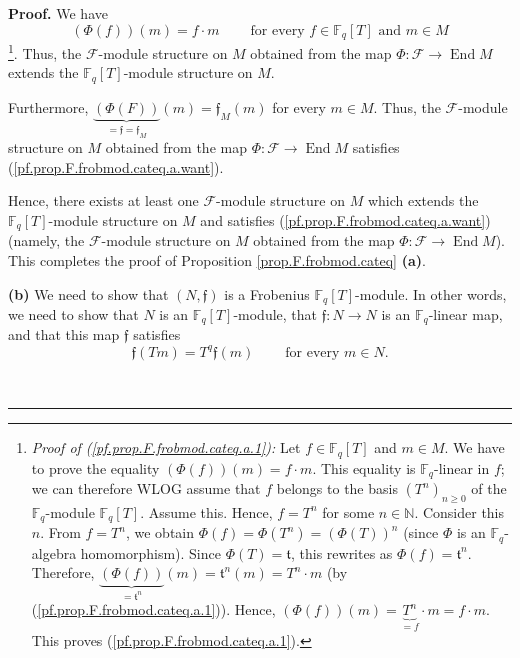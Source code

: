 \documentclass[numbers=enddot,12pt,final,onecolumn,notitlepage]{scrartcl}%
\theoremstyle{definition}
\newenvironment{proof}[1][Proof]{\noindent\textbf{#1.} }{\ \rule{0.5em}{0.5em}}
\begin{document}
\begin{proof}
We have
\begin{equation}
\left(  \Phi\left(  f\right)  \right)  \left(  m\right)  =f\cdot
m\ \ \ \ \ \ \ \ \ \ \text{for every }f\in\mathbb{F}_{q}\left[  T\right]
\text{ and }m\in M \label{pf.prop.F.frobmod.cateq.a.3}%
\end{equation}
\footnote{\textit{Proof of (\ref{pf.prop.F.frobmod.cateq.a.1}):} Let
$f\in\mathbb{F}_{q}\left[  T\right]  $ and $m\in M$. We have to prove the
equality $\left(  \Phi\left(  f\right)  \right)  \left(  m\right)  =f\cdot m$.
This equality is $\mathbb{F}_{q}$-linear in $f$; we can therefore WLOG assume
that $f$ belongs to the basis $\left(  T^{n}\right)  _{n\geq0}$ of the
$\mathbb{F}_{q}$-module $\mathbb{F}_{q}\left[  T\right]  $. Assume this.
Hence, $f=T^{n}$ for some $n\in\mathbb{N}$. Consider this $n$. From $f=T^{n}$,
we obtain $\Phi\left(  f\right)  =\Phi\left(  T^{n}\right)  =\left(
\Phi\left(  T\right)  \right)  ^{n}$ (since $\Phi$ is an $\mathbb{F}_{q}%
$-algebra homomorphism). Since $\Phi\left(  T\right)  =\mathfrak{t}$, this
rewrites as $\Phi\left(  f\right)  =\mathfrak{t}^{n}$. Therefore,
$\underbrace{\left(  \Phi\left(  f\right)  \right)  }_{=\mathfrak{t}^{n}%
}\left(  m\right)  =\mathfrak{t}^{n}\left(  m\right)  =T^{n}\cdot m$ (by
(\ref{pf.prop.F.frobmod.cateq.a.1})). Hence, $\left(  \Phi\left(  f\right)
\right)  \left(  m\right)  =\underbrace{T^{n}}_{=f}\cdot m=f\cdot m$. This
proves (\ref{pf.prop.F.frobmod.cateq.a.1}).}. Thus, the $\mathcal{F}$-module
structure on $M$ obtained from the map $\Phi:\mathcal{F}\rightarrow
\operatorname*{End}M$ extends the $\mathbb{F}_{q}\left[  T\right]  $-module
structure on $M$.

Furthermore, $\underbrace{\left(  \Phi\left(  F\right)  \right)
}_{=\mathfrak{f}=\mathfrak{f}_{M}}\left(  m\right)  =\mathfrak{f}_{M}\left(
m\right)  $ for every $m\in M$. Thus, the $\mathcal{F}$-module structure on
$M$ obtained from the map $\Phi:\mathcal{F}\rightarrow\operatorname*{End}M$
satisfies (\ref{pf.prop.F.frobmod.cateq.a.want}).

Hence, there exists at least one $\mathcal{F}$-module structure on $M$ which
extends the $\mathbb{F}_{q}\left[  T\right]  $-module structure on $M$ and
satisfies (\ref{pf.prop.F.frobmod.cateq.a.want}) (namely, the $\mathcal{F}%
$-module structure on $M$ obtained from the map $\Phi:\mathcal{F}%
\rightarrow\operatorname*{End}M$). This completes the proof of Proposition
\ref{prop.F.frobmod.cateq} \textbf{(a)}.

\textbf{(b)} We need to show that $\left(  N,\mathfrak{f}\right)  $ is a
Frobenius $\mathbb{F}_{q}\left[  T\right]  $-module. In other words, we need
to show that $N$ is an $\mathbb{F}_{q}\left[  T\right]  $-module, that
$\mathfrak{f}:N\rightarrow N$ is an $\mathbb{F}_{q}$-linear map, and that this
map $\mathfrak{f}$ satisfies%
\begin{equation}
\mathfrak{f}\left(  Tm\right)  =T^{q}\mathfrak{f}\left(  m\right)
\ \ \ \ \ \ \ \ \ \ \text{for every }m\in N.
\label{pf.prop.F.frobmod.cateq.b.want}%
\end{equation}



\end{proof}
\end{document}
